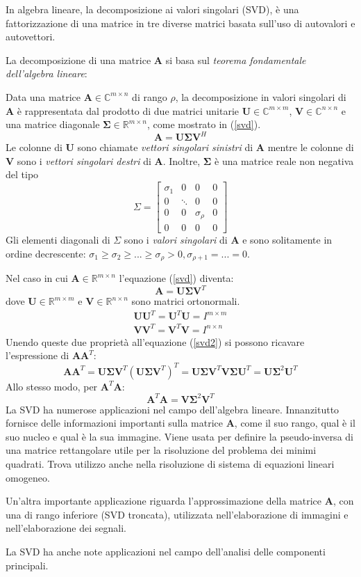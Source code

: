 In algebra lineare, la decomposizione ai valori singolari (SVD), è una fattorizzazione di una matrice in tre diverse matrici basata sull'uso di autovalori e autovettori.

La decomposizione di una matrice $\mathbf{A}$ si basa sul \textit{teorema fondamentale dell'algebra lineare}: 

Data una matrice $\mathbf{A}\in\mathbb{C}^{m\times n}$ di rango $\rho$, la decomposizione in valori singolari di $\mathbf{A}$ è rappresentata dal prodotto di due matrici unitarie $\mathbf{U}\in\mathbb{C}^{m\times m}$, $\mathbf{V}\in\mathbb{C}^{n\times n}$ e una matrice diagonale $\mathbf{\Sigma}\in\mathbb{R}^{m\times n}$, come mostrato in (\ref{svd}).
\begin{equation}\label{svd}
\mathbf{A}=\mathbf{U}\mathbf{\Sigma}\mathbf{V}^H
\end{equation}
Le colonne di $\mathbf{U}$ sono chiamate \textit{vettori singolari sinistri} di $\mathbf{A}$ mentre le colonne di $\mathbf{V}$ sono i \textit{vettori singolari destri} di $\mathbf{A}$. Inoltre, $\mathbf{\Sigma}$ è una matrice reale non negativa del tipo
\[
\Sigma=\begin{bmatrix}
\sigma_1 & 0 & 0 & 0\\
0 & \ddots & 0 & 0\\
0 & 0 & \sigma_{\rho} & 0\\
0 & 0 & 0 & 0
\end{bmatrix}
\]
Gli elementi diagonali di $\Sigma$ sono i \textit{valori singolari} di $\mathbf{A}$ e sono solitamente in ordine decrescente: $\sigma_1 \geq \sigma_2 \geq ... \geq \sigma_{\rho} > 0, \sigma_{\rho+1}=...=0$.

Nel caso in cui $\mathbf{A}\in\mathbb{R}^{m\times n}$ l'equazione (\ref{svd}) diventa:
\begin{equation}\label{svd2}
\mathbf{A}=\mathbf{U}\mathbf{\Sigma}\mathbf{V}^T
\end{equation}
dove $\mathbf{U}\in\mathbb{R}^{m\times m}$ e $\mathbf{V}\in\mathbb{R}^{n\times n}$ sono matrici ortonormali.
\begin{eqnarray}
\mathbf{U}\mathbf{U}^T=\mathbf{U}^T\mathbf{U}=I^{m\times m}\\
\mathbf{V}\mathbf{V}^T=\mathbf{V}^T\mathbf{V}=I^{n\times n}
\end{eqnarray}
Unendo queste due proprietà all'equazione (\ref{svd2}) si possono ricavare l'espressione di $\mathbf{A}\mathbf{A}^T$:
\[
\mathbf{A}\mathbf{A}^T=\mathbf{U}\mathbf{\Sigma}\mathbf{V}^T(\mathbf{U}\mathbf{\Sigma}\mathbf{V}^T)^T=\mathbf{U}\mathbf{\Sigma}\mathbf{V}^T\mathbf{V}\mathbf{\Sigma}\mathbf{U}^T=\mathbf{U}\mathbf{\Sigma}^2\mathbf{U}^T
\]
Allo stesso modo, per $\mathbf{A}^T\mathbf{A}$:
\[
\mathbf{A}^T\mathbf{A}=\mathbf{V}\mathbf{\Sigma}^2\mathbf{V}^T
\]
La SVD ha numerose applicazioni nel campo dell'algebra lineare. Innanzitutto fornisce delle informazioni importanti sulla matrice $\mathbf{A}$, come il suo rango, qual è il suo nucleo e qual è la sua immagine. Viene usata per definire la pseudo-inversa di una matrice rettangolare utile per la risoluzione del problema dei minimi quadrati. Trova utilizzo anche nella risoluzione di sistema di equazioni lineari omogeneo.

Un'altra importante applicazione riguarda l'approssimazione della matrice $\mathbf{A}$, con una di rango inferiore (SVD troncata), utilizzata nell'elaborazione di immagini e nell'elaborazione dei segnali.

La SVD ha anche note applicazioni nel campo dell'analisi delle componenti principali.


